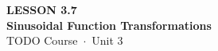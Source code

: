 \documentclass[aspectratio=169, 11pt]{beamer}
\begin{document}
{
\begin{frame}[plain]
  \vspace{2.8cm}\hspace{0.55cm}%
  \begin{minipage}{0.9\textwidth}
    {\color{goldacc}\bfseries\small LESSON 3.7}\\[0.5cm]
    {\color{white}\bfseries\LARGE Sinusoidal Function Transformations}\\[1.2cm]
    {\color{skymid}\small TODO Course~$\cdot$~Unit 3}
  \end{minipage}
\end{frame}
}

\begin{frame}[t, plain]
\end{frame}
\end{document}
